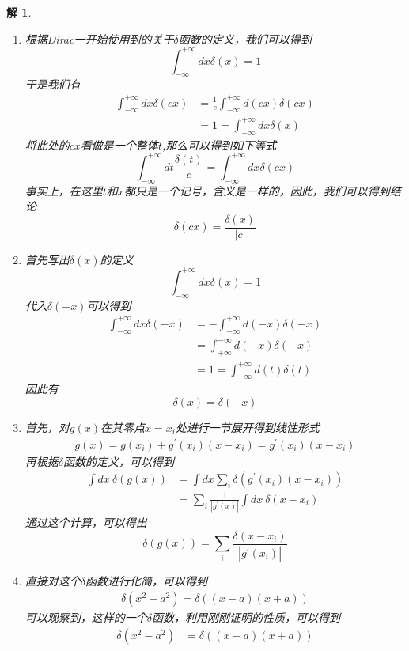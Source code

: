 \documentclass{article}
\newtheorem{solution}{解}
\begin{document}
\begin{solution}
    

\begin{enumerate}
    \item[(a)] 根据Dirac一开始使用到的关于$\delta$函数的定义，我们可以得到
    \[\int_{-\infty}^{+\infty}dx\delta(x)=1\]
    于是我们有
    \begin{align*}
        \int_{-\infty}^{+\infty}dx\delta(cx)&=\frac{1}{c}\int_{-\infty}^{+\infty}d(cx)\delta(cx)\\
        &=1=\int_{-\infty}^{+\infty}dx\delta(x)
    \end{align*}
    将此处的$cx$看做是一个整体$t$,那么可以得到如下等式
    \[\int_{-\infty}^{+\infty}dt\frac{\delta(t)}{c}=\int_{-\infty}^{+\infty}dx\delta(cx)\]
    事实上，在这里$t$和$x$都只是一个记号，含义是一样的，因此，我们可以得到结论
    \[\delta(cx)=\frac{\delta(x)}{|c|}\]
    \item[(b)] 首先写出$\delta(x)$的定义
    \[\int_{-\infty}^{+\infty}dx\delta(x)=1\]
    代入$\delta(-x)$可以得到
    \begin{align*}
        \int_{-\infty}^{+\infty}dx\delta(-x)&=-\int_{-\infty}^{+\infty}d(-x)\delta(-x)\\
        &=\int_{+\infty}^{-\infty}d(-x)\delta(-x)\\
        &=1=\int_{-\infty}^{+\infty}d(t)\delta(t)
    \end{align*}
    因此有\[\delta(x)=\delta(-x)\]
    \item[(c)] 首先，对$g(x)$在其零点$x=x_i$处进行一节展开得到线性形式
    \begin{align*}
        g(x)=g(x_i)+g^{'}(x_i)(x-x_i)=g^{'}(x_i)(x-x_i)
    \end{align*}
    再根据$\delta$函数的定义，可以得到
    \begin{align*}
        \int dx\ \delta(g(x))&=\int dx\sum_{i}\delta(g^{'}(x_i)(x-x_i))\\
        &=\sum_{i}\frac{1}{|g^{'}(x)|}\int dx\ \delta(x-x_i)
    \end{align*}
    通过这个计算，可以得出
    \[
        \delta(g(x))=\sum_{i}\frac{\delta(x-x_i)}{|g^{'}(x_i)|}
    \]
    \item[(d)] 直接对这个$\delta$函数进行化简，可以得到
    \begin{align*}
        \delta(x^2-a^2)=\delta\left((x-a)(x+a)\right)
    \end{align*}
    可以观察到，这样的一个$\delta$函数，利用刚刚证明的性质，可以得到
    \begin{align*}
        \delta(x^2-a^2)&=\delta\left((x-a)(x+a)\right)\\

\end{align*}
\end{enumerate}
\end{solution}
\end{document}
